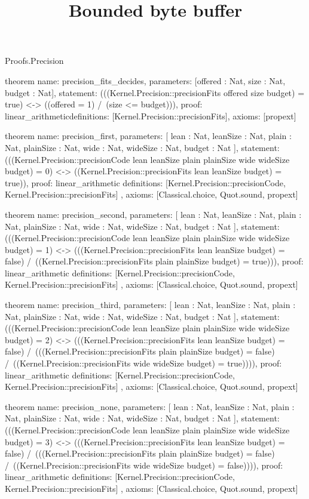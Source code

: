 \begin{lexlean}{Proofs.Precision}
\title{Bounded byte buffer}
\begin{semanticmodule}
theorem{
  name: precision_fits_decides,
  parameters: [offered : Nat, size : Nat, budget : Nat],
  statement: (((Kernel.Precision::precisionFits offered size budget) = true) <-> ((offered = 1) /\ (size <= budget))),
  proof: linear_arithmetic{definitions: [Kernel.Precision::precisionFits]},
  axioms: [propext]
}

theorem{
  name: precision_first,
  parameters: [
    lean : Nat,
    leanSize : Nat,
    plain : Nat,
    plainSize : Nat,
    wide : Nat,
    wideSize : Nat,
    budget : Nat
  ],
  statement: (((Kernel.Precision::precisionCode lean leanSize plain plainSize wide wideSize budget) = 0) <-> ((Kernel.Precision::precisionFits lean leanSize budget) = true)),
  proof: linear_arithmetic{
    definitions: [Kernel.Precision::precisionCode, Kernel.Precision::precisionFits]
  },
  axioms: [Classical.choice, Quot.sound, propext]
}

theorem{
  name: precision_second,
  parameters: [
    lean : Nat,
    leanSize : Nat,
    plain : Nat,
    plainSize : Nat,
    wide : Nat,
    wideSize : Nat,
    budget : Nat
  ],
  statement: (((Kernel.Precision::precisionCode lean leanSize plain plainSize wide wideSize budget) = 1) <-> (((Kernel.Precision::precisionFits lean leanSize budget) = false) /\ ((Kernel.Precision::precisionFits plain plainSize budget) = true))),
  proof: linear_arithmetic{
    definitions: [Kernel.Precision::precisionCode, Kernel.Precision::precisionFits]
  },
  axioms: [Classical.choice, Quot.sound, propext]
}

theorem{
  name: precision_third,
  parameters: [
    lean : Nat,
    leanSize : Nat,
    plain : Nat,
    plainSize : Nat,
    wide : Nat,
    wideSize : Nat,
    budget : Nat
  ],
  statement: (((Kernel.Precision::precisionCode lean leanSize plain plainSize wide wideSize budget) = 2) <-> (((Kernel.Precision::precisionFits lean leanSize budget) = false) /\ (((Kernel.Precision::precisionFits plain plainSize budget) = false) /\ ((Kernel.Precision::precisionFits wide wideSize budget) = true)))),
  proof: linear_arithmetic{
    definitions: [Kernel.Precision::precisionCode, Kernel.Precision::precisionFits]
  },
  axioms: [Classical.choice, Quot.sound, propext]
}

theorem{
  name: precision_none,
  parameters: [
    lean : Nat,
    leanSize : Nat,
    plain : Nat,
    plainSize : Nat,
    wide : Nat,
    wideSize : Nat,
    budget : Nat
  ],
  statement: (((Kernel.Precision::precisionCode lean leanSize plain plainSize wide wideSize budget) = 3) <-> (((Kernel.Precision::precisionFits lean leanSize budget) = false) /\ (((Kernel.Precision::precisionFits plain plainSize budget) = false) /\ ((Kernel.Precision::precisionFits wide wideSize budget) = false)))),
  proof: linear_arithmetic{
    definitions: [Kernel.Precision::precisionCode, Kernel.Precision::precisionFits]
  },
  axioms: [Classical.choice, Quot.sound, propext]
}


\end{semanticmodule}
\end{lexlean}
